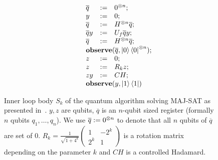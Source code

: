 \documentclass[a4paper,UKenglish,cleveref, autoref, thm-restate]{lipics-v2021}
\begin{document}
\begin{figure}
  \[\begin{array}{lcl}
      \overline{q} & \df & 0^{\otimes n};\\
      y & \df & 0;\\
      \overline{q} & \df & H^{\otimes n}\overline{q};\\
      \overline{q}y & \df & U_f \overline{q}y; \\
      \overline{q} & \df & H^{\otimes n}\overline{q};\\
      \mathbf{observe}(\overline{q}, \ket{0}\bra{0}^{\otimes n});\hskip-2in {} \\
      z & \df & 0;\\
      z & \df & R_k z;\\
      zy & \df & CH;\\
      \mathbf{observe}(y, \ket{1}\bra{1})\hskip-2in {}
    \end{array}
  \]
  \caption{Inner loop body $S_k$ of the quantum algorithm solving MAJ-SAT as presented in~\cite{postbqp}. $y,z$ are qubits, $\overline{q}$ is an $n$-qubit sized register (formally $n$ qubits $q_1,\dots,q_n$). We use $\overline{q} := 0^{\otimes n}$ to denote that all $n$ qubits of $\overline{q}$ are set of $0$. $R_k = \frac{1}{\sqrt{1+4^k}}\begin{pmatrix} 1 & -2^k \\ 2^k & 1 \end{pmatrix}$ is a rotation matrix depending on the parameter $k$ and $CH$ is a controlled Hadamard.}
  \label{fig:program}
\end{figure}
\end{document}
